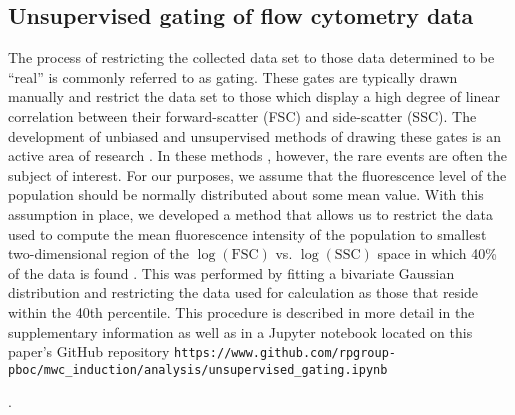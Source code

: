 \subsection*{Unsupervised gating of flow cytometry data}
The process of restricting the collected data set to those data determined to
be ``real'' is commonly referred to as gating. These gates are typically drawn
manually \cite{Maecker2005} and restrict the data set to those
 which display a high degree of linear correlation  between
their forward-scatter (FSC) and side-scatter (SSC). The development of unbiased
and unsupervised methods of drawing these gates is an active area of research
\cite{Aghaeepour2013, Lo2008}. In these methods , however, the
rare events are often the subject of interest. For our purposes, we assume that
the fluorescence level of the population should be normally distributed about
some mean value. With this  assumption in place, we developed a method that
allows us to restrict the data used  to compute the mean fluorescence intensity
of the population to smallest two-dimensional  region of the
$\log(\mathrm{FSC})$ vs. $\log(\mathrm{SSC})$ space in which 40\% of the data
is found . This  was performed by fitting a
bivariate Gaussian distribution and restricting the data used for calculation
as those that reside within the 40th percentile.  This procedure is  described in more detail in the
supplementary information as well as in a  Jupyter notebook located on this
paper's GitHub repository
\texttt{https://www.github.com/rpgroup-pboc/mwc\_induction/analysis/unsupervised\_gating.ipynb}

.

